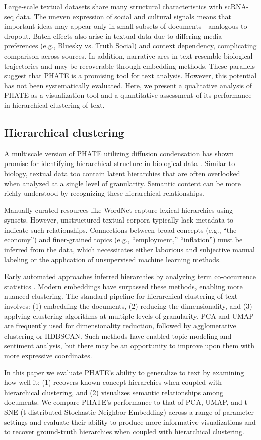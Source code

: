 Large-scale textual datasets share many structural characteristics with scRNA-seq data. The uneven expression of social and cultural signals means that important ideas may appear only in small subsets of documents—analogous to dropout. Batch effects also arise in textual data due to differing media preferences (e.g., Bluesky vs. Truth Social) and context dependency, complicating comparison across sources. In addition, narrative arcs in text resemble biological trajectories and may be recoverable through embedding methods. These parallels suggest that PHATE is a promising tool for text analysis. However, this potential has not been systematically evaluated. Here, we present a qualitative analysis of PHATE as a visualization tool and a quantitative assessment of its performance in hierarchical clustering of text.

\subsection{Hierarchical clustering}
A multiscale version of PHATE utilizing diffusion condensation \cite{brugnone2019coarse} has shown promise for identifying hierarchical structure in biological data \cite{kuchroo2022multiscale}. Similar to biology, textual data too contain latent hierarchies that are often overlooked when analyzed at a single level of granularity. Semantic content can be more richly understood by recognizing these hierarchical relationships.

Manually curated resources like WordNet capture lexical hierarchies using synsets. However, unstructured textual corpora typically lack metadata to indicate such relationships. Connections between broad concepts (e.g., “the economy”) and finer-grained topics (e.g., “employment,” “inflation”) must be inferred from the data, which necessitates either laborious and subjective manual labeling or the application of unsupervised machine learning methods.

Early automated approaches inferred hierarchies by analyzing term co-occurrence statistics \cite{sanderson1999deriving}. Modern embeddings have surpassed these methods, enabling more nuanced clustering. The standard pipeline for hierarchical clustering of text involves: (1) embedding the documents, (2) reducing the dimensionality, and (3) applying clustering algorithms at multiple levels of granularity. PCA and UMAP are frequently used for dimensionality reduction, followed by agglomerative clustering or HDBSCAN. Such methods have enabled topic modeling and sentiment analysis, but there may be an opportunity to improve upon them with more expressive coordinates.

In this paper we evaluate PHATE’s ability to generalize to text by examining how well it: (1) recovers known concept hierarchies when coupled with hierarchical clustering, and (2) visualizes semantic relationships among documents. We compare PHATE’s performance to that of PCA, UMAP, and t-SNE (t-distributed Stochastic Neighbor Embedding) across a range of parameter settings and evaluate their ability to produce more informative visualizations and to recover ground-truth hierarchies when coupled with hierarchical clustering.
